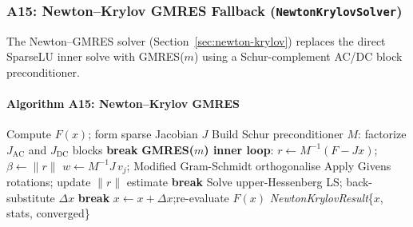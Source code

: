 \subsubsection{A15: Newton--Krylov GMRES Fallback (\texttt{NewtonKrylovSolver})}
\label{algo:a15}

The Newton--GMRES solver (Section~\ref{sec:newton-krylov}) replaces the
direct SparseLU inner solve with GMRES($m$) using a Schur-complement
AC/DC block preconditioner.

\paragraph{Algorithm A15: Newton--Krylov GMRES}
\begin{algorithmic}[1]
  \State Compute $F(x)$; form sparse Jacobian $J$
  \State Build Schur preconditioner $M$: factorize $J_\mathrm{AC}$ and $J_\mathrm{DC}$ blocks
     \textbf{break} \EndIf
    \State \textbf{GMRES($m$) inner loop}:
      \State $r \gets M^{-1}(F - Jx)$;\quad $\beta \gets \|r\|$
        \State $w \gets M^{-1}J\,v_j$; Modified Gram-Schmidt orthogonalise
        \State Apply Givens rotations; update $\|r\|$ estimate
         \textbf{break} \EndIf
      \EndFor
      \State Solve upper-Hessenberg LS; back-substitute $\Delta x$
       \textbf{break} \EndIf
    \EndFor
    \State $x \gets x + \Delta x$;\quad re-evaluate $F(x)$
  \EndFor
  \State \Return \textit{NewtonKrylovResult}\{$x$, stats, converged\}
\EndProcedure
\end{algorithmic}

